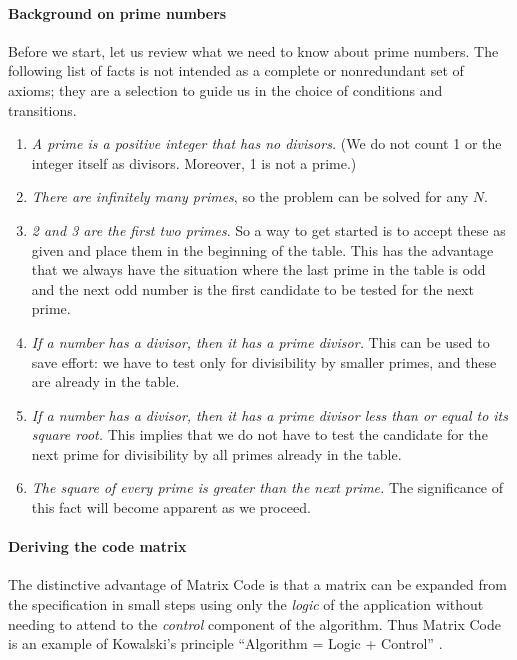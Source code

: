 \documentclass[preprint,11pt]{elsarticle}
\begin{document}
\paragraph{Background on prime numbers}
Before we start,
let us review what we need to know about prime numbers.
The following list of facts is not intended as a
complete or nonredundant set of axioms;
they are a selection to guide us in the choice
of conditions and transitions.
\begin{enumerate}
\item
\emph{A prime is a positive integer that has no divisors.}
(We do not count 1 or the integer itself as divisors.
Moreover, 1 is not a prime.)
\item \label{axiom:infinity}
\emph{There are infinitely many primes},
so the problem can be solved for any $N$.
\item \emph{2 and 3 are the first two primes}.
So a way to get started is to accept these as given
and place them in the beginning of the table.
This has the advantage
that we always have the situation
where the last prime in the table is odd
and the next odd number is the first candidate to be tested
for the next prime.
\item \label{axiom:suff}
\emph{If a number has a divisor,
then it has a prime divisor.}
This can be used to save effort:
we have to test only for divisibility by smaller primes,
and these are already in the table.
\item \label{axiom:limit}
\emph{If a number has a divisor,
then it has a prime divisor
less than or equal to its square root.}
This implies that we do not have to test
the candidate for the next prime for divisibility
by all primes already in the table.
\item \label{axiom:square}
\emph{The square of every prime is greater than the next prime.}
The significance of this fact will become apparent as we proceed.
\end{enumerate}

\paragraph{Deriving the code matrix}
The distinctive advantage of Matrix Code is
that a matrix can be expanded from the specification
in small steps using only the \emph{logic}
of the application without needing to attend
to the \emph{control} component of the algorithm.
Thus Matrix Code is an example of Kowalski's principle
``Algorithm = Logic + Control'' \cite{kwl79a}.
\end{document}
